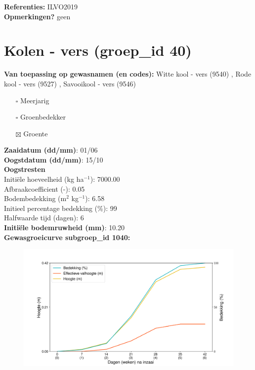 \documentclass{article}
\begin{document}
  \textbf{Referenties:} ILVO2019 \vspace{0.10cm} \\ 
  \textbf{Opmerkingen?} geen \vspace{0.10cm} \\ 
 \newpage 
 \section{Kolen - vers (groep\_id 40)} 
 \textbf{Van toepassing op gewasnamen (en codes):} Witte kool - vers (9540) , Rode kool - vers (9527) , Savooikool - vers (9546) 
 \begin{multicols}{3} \begin{itemize} \item[$\square$] Meerjarig \item[$\square$] Groenbedekker \item[$\boxtimes$] Groente \end{itemize} \end{multicols} 
  \textbf{Zaaidatum (dd/mm)}: 01/06  \vspace{0.10cm} \\ 
  \textbf{Oogstdatum (dd/mm)}: 15/10  \vspace{0.10cm} \\ 
  \textbf{Oogstresten} \vspace{0.05cm} \\ 
  \tab Initi\"{e}le hoeveelheid (kg ha$^{-1}$): 7000.00 \vspace{0.05cm} \\ 
  \tab Afbraakcoefficient (-): 0.05 \vspace{0.05cm} \\ 
  \tab Bodembedekking (m$^2$ kg$^{-1}$): 6.58 \vspace{0.05cm} \\ 
  \tab Initieel percentage bedekking (\%): 99 \vspace{0.05cm} \\ 
  \tab Halfwaarde tijd (dagen): 6 \vspace{0.05cm} \\ 
  \textbf{Initi\"{e}le bodemruwheid (mm)}: 10.20 \vspace{0.05cm} \\ 
  \textbf{Gewasgroeicurve subgroep\_id 1040:} 
 \begin{center} \begin{figure}[H] \includegraphics[width=12.5cm]{temp/1040.png} \end{figure} \end{center} 
\end{document}
